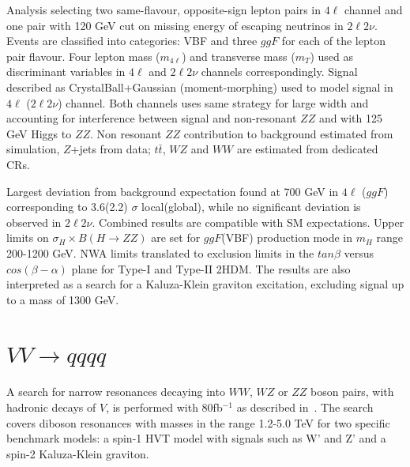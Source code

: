 \documentclass{PoS}
\begin{document}
Analysis selecting two same-flavour, opposite-sign lepton pairs in $4\ell$ channel and one pair with 120 GeV cut on missing energy of escaping neutrinos in $2\ell2\nu$.
Events are classified into categories: VBF and three $ggF$ for each of the lepton pair flavour.
Four lepton mass ($m_{4\ell}$) and transverse mass ($m_T$) used as discriminant variables in $4\ell$ and $2\ell2\nu$ channels correspondingly.
Signal described as CrystalBall+Gaussian (moment-morphing) used to model signal in $4\ell$ ($2\ell2\nu$) channel. Both channels uses same strategy for large width and accounting for interference between signal and non-resonant $ZZ$ and with 125 GeV Higgs to $ZZ$.
Non resonant $ZZ$ contribution to background estimated from simulation, $Z$+jets from data; $t\bar{t}$, $WZ$ and $WW$ are estimated from dedicated CRs.

Largest deviation from background expectation found at 700 GeV in $4\ell$ ($ggF$) corresponding to 3.6(2.2) $\sigma$ local(global), while no significant deviation is observed in $2\ell2\nu$. Combined results are compatible with SM expectations. 
Upper limits on $\sigma_H \times B(H\rightarrow ZZ)$ are set  for $ggF$(VBF) production mode in $m_H$ range 200-1200 GeV. NWA limits translated to exclusion limits in the $tan \beta$ versus $cos(\beta-\alpha)$ plane for Type-I and Type-II 2HDM.
The results are also interpreted as a search for a Kaluza-Klein graviton excitation, excluding signal up to a mass of 1300 GeV. 


\section{$VV\rightarrow qqqq$}
\label{sec:VV}
A search for narrow resonances decaying into $WW$, $WZ$ or $ZZ$ boson pairs, with hadronic decays of $V$, is performed with 80fb$^{-1}$ as described in~\cite{ATLAS-CONF-2018-016}. The search covers diboson resonances with masses in the range 1.2-5.0 TeV for two specific benchmark models: a spin-1 HVT model with signals such as W' and Z' and a spin-2 Kaluza-Klein graviton.
\end{document}

